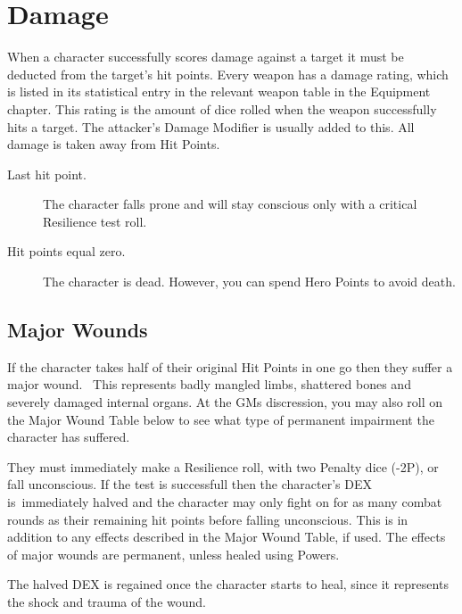 \section{Damage}
When a character successfully scores damage against a target it must be deducted from the target’s hit points. Every weapon has a damage rating, which is listed in its statistical entry in the relevant weapon table in the Equipment chapter. This rating is the amount of dice rolled when the weapon successfully hits a target. The attacker’s Damage Modifier is usually added to this. All damage is taken away from Hit Points. 

\begin{description}
	\item[Last hit point.] The character falls prone and will stay conscious only with a critical Resilience test roll.
	\item[Hit points equal zero.] The character is dead. However, you can spend Hero Points to avoid death.
\end{description}


\subsection{Major Wounds}
If the character takes half of their original Hit Points in one go then they suffer a major wound.  This represents badly mangled limbs, shattered bones and severely damaged internal organs.
At the GMs discression, you may also roll on the Major Wound Table below to see what type of permanent impairment the character has suffered.

They must immediately make a Resilience roll, with two Penalty dice (-2P), or fall unconscious. If the test is successfull then the character’s DEX is immediately halved and the character may only fight on for as many combat rounds as their remaining hit points before falling unconscious.
This is in addition to any effects described in the Major Wound Table, if used. The effects of major wounds are permanent, unless healed using Powers.

The halved DEX is regained once the character starts to heal, since it represents the shock and trauma of the wound.

